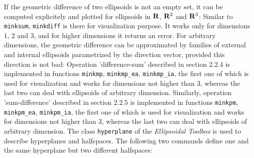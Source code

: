 If the geometric difference of two ellipsoids is not an empty set, it can
be computed explicitely and plotted for ellipsoids in ${\bf R}$,
${\bf R}^2$ and ${\bf R}^3$:
Similar to {\tt minksum}, {\tt minkdiff} is there for visualization
purpose. It works only for dimensions $1$, $2$ and $3$, and for higher
dimensions it returns an error. For arbitrary dimensions, the geometric
difference can be approximated by  families of external and internal
ellipsoids parametrized by the direction vector, provided this direction
is not bad:
Operation 'difference-sum' described in section 2.2.4 is implemented in
functions {\tt minkmp}, {\tt minkmp\_ea}, {\tt minkmp\_ia}, the first one of
which is used for visualization and works for dimensions not higher than $3$,
whereas the last two can deal with ellipsoids of arbitrary dimension.
Similarly, operation 'sum-difference' described in section 2.2.5
is implemented in
functions {\tt minkpm}, {\tt minkpm\_ea}, {\tt minkpm\_ia}, the first one of
which is used for visualization and works for dimensions not higher than $3$,
whereas the last two can deal with ellipsoids of arbitrary dimension.
The class {\tt hyperplane} of the {\it Ellipsoidal Toolbox} is used
to describe hyperplanes and halfspaces. The following two commands
define one and the same hyperplane but two different halfspaces:

